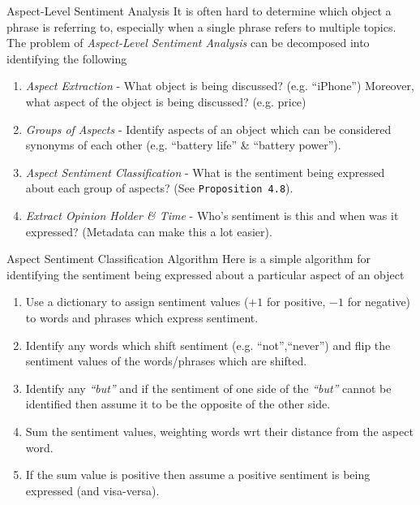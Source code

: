 \documentclass[11pt,a4paper]{article}
\begin{document}
  \begin{remark}{Aspect-Level Sentiment Analysis}
    It is often hard to determine which object a phrase is referring to, especially when a single phrase refers to multiple topics. The problem of \textit{Aspect-Level Sentiment Analysis} can be decomposed into identifying the following
    \begin{enumerate}
      \item \textit{Aspect Extraction} - What object is being discussed? (e.g. ``iPhone'') Moreover, what aspect of the object is being discussed? (e.g. price)
      \item \textit{Groups of Aspects} - Identify aspects of an object which can be considered synonyms of each other (e.g. ``battery life'' \& ``battery power'').
      \item \textit{Aspect Sentiment Classification} - What is the sentiment being expressed about each group of aspects? (See \texttt{Proposition 4.8}).
      \item \textit{Extract Opinion Holder \& Time} - Who's sentiment is this and when was it expressed? (Metadata can make this a lot easier).
    \end{enumerate}
  \end{remark}

  \begin{proposition}{Aspect Sentiment Classification Algorithm}
    Here is a simple algorithm for identifying the sentiment being expressed about a particular aspect of an object
    \begin{enumerate}
      \item Use a dictionary to assign sentiment values ($+1$ for positive, $-1$ for negative) to words and phrases which express sentiment.
      \item Identify any words which shift sentiment (e.g. ``not'',``never'') and flip the sentiment values of the words/phrases which are shifted.
      \item Identify any \textit{``but''} and if the sentiment of one side of the \textit{``but''} cannot be identified then assume it to be the opposite of the other side.
      \item Sum the sentiment values, weighting words wrt their distance from the aspect word.
      \item If the sum value is positive then assume a positive sentiment is being expressed (and visa-versa).
    \end{enumerate}
  \end{proposition}
\end{document}
